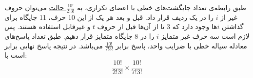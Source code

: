 \p
طبق رابطه‌ی تعداد جایگشت‌های خطی با اعضای تکراری، به 
\underline{$\frac{10!}{2!3!}$ حالت}
 می‌توان حروف غیر از
 $i$ را در یک ردیف قرار داد.
 قبل و بعد هر یک از این 10 حرف، 11 جایگاه برای گذاشتن
 $i$ها 
  وجود دارد که 3 تا از آن‌ها قبل از حروف 
  $t$
   و غیرقابل استفاده
  هستند.
پس لازم است سه حرف غیر متمایز
$i$
را
در 8 جایگاه متمایز قرار دهیم. 
طبق تعداد پاسخ‌های معادله سیاله خطی با ضرایب واحد،
پاسخ برابر
\underline{$\frac{10!}{7!3!}$}
می‌باشد.
در نتیجه پاسخ نهایی برابر است با:
$$\frac{10!}{2!3!}  \times \frac{10!}{7!3!}$$

